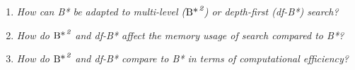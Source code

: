 \begin{enumerate} %
    \item \textit{How can B* be adapted to multi-level (${\text{B*}}^{\text{\hspace{1pt}}\textit{2}}$) or depth-first (df-B*) search?}
    \item \textit{How do ${\text{B*}}^{\text{\hspace{1pt}}\textit{2}}$ and df-B* affect the memory usage of search compared to B*?}
    \item \textit{How do ${\text{B*}}^{\text{\hspace{1pt}}\textit{2}}$ and df-B* compare to B* in terms of computational efficiency?}
\end{enumerate}
